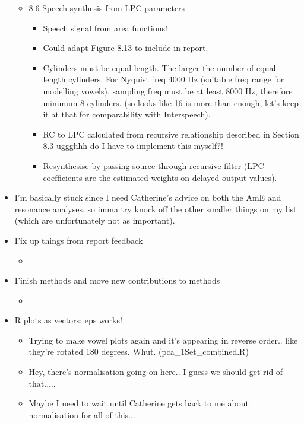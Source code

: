 \documentclass{article}
\begin{document}
\begin{itemize}
\begin{itemize}
\begin{itemize}
        \end{itemize}
        \item 8.6 Speech synthesis from LPC-parameters
        \begin{itemize}
            \item Speech signal from area functions!
            \item Could adapt Figure 8.13 to include in report.
            \item Cylinders must be equal length. The larger the number of equal-length cylinders. For Nyquist freq 4000 Hz (suitable freq range for modelling vowels), sampling freq must be at least 8000 Hz, therefore minimum 8 cylinders. (so looks like 16 is more than enough, let's keep it at that for comparability with Interspeech).
            \item RC to LPC calculated from recursive relationship described in Section 8.3 uggghhh do I have to implement this myself?!
            \item Resynthesise by passing source through recursive filter (LPC coefficients are the estimated weights on delayed output values).
        \end{itemize}
    \end{itemize}
    \item I'm basically stuck since I need Catherine's advice on both the AmE and resonance analyses, so imma try knock off the other smaller things on my list (which are unfortunately not as important).
    \item Fix up things from report feedback
    \begin{itemize}
        \item 
    \end{itemize}
    \item Finish methods and move new contributions to methods
    \begin{itemize}
        \item
    \end{itemize}
    \item R plots as vectors: eps works!
    \begin{itemize}
        \item Trying to make vowel plots again and it's appearing in reverse order.. like they're rotated 180 degrees. Whut. (\verb||pca_1Set_combined.R)
        \item Hey, there's normalisation going on here.. I guess we should get rid of that.....
        \item Maybe I need to wait until Catherine gets back to me about normalisation for all of this...

\end{itemize}
\end{itemize}
\end{document}
